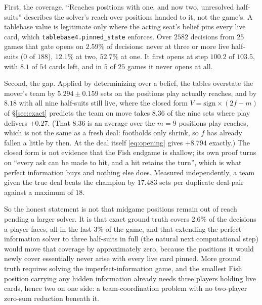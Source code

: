 \documentclass[11pt,letterpaper]{article}
\begin{document}
First, the coverage. ``Reaches positions with one, and now two, unresolved
half-suits'' describes the solver's reach over positions handed to it, not the
game's. A tablebase value is legitimate only where the acting seat's belief pins
every live card, which \texttt{tablebase4.pinned\_state} enforces. Over $2582$
decisions from $25$ games that gate opens on $2.59\%$ of decisions: never at
three or more live half-suits ($0$ of $188$), $12.1\%$ at two, $52.7\%$ at one.
It first opens at step $100.2$ of $103.5$, with $8.1$ of $54$ cards left, and in
$5$ of $25$ games it never opens at all.

Second, the gap. Applied by determinizing over a belief, the tables overstate
the mover's team by $5.294 \pm 0.159$ sets on the positions play actually
reaches, and by $8.18$ with all nine half-suits still live, where the closed form
$V = \mathrm{sign} \times (2f - m)$ of \S\ref{sec:exact} predicts the team on
move takes $8.36$ of the nine sets where play delivers $+0.27$. (That $8.36$ is
an average over the $m = 9$ positions play reaches, which is not the same as a
fresh deal: footholds only shrink, so $f$ has already fallen a little by then.
At the deal itself \eqref{eq:opening} gives $+8.794$ exactly.) The closed form
is not evidence that the Fish endgame is shallow; its own proof turns on ``every
ask can be made to hit, and a hit retains the turn'', which is what perfect
information buys and nothing else does. Measured independently, a team given
the true deal beats the champion by $17.483$ sets per duplicate deal-pair
against a maximum of $18$.

So the honest statement is not that midgame positions remain out of reach
pending a larger solver. It is that exact ground truth covers $2.6\%$ of the
decisions a player faces, all in the last $3\%$ of the game, and that extending
the perfect-information solver to three half-suits in full (the natural next
computational step) would move that coverage by approximately zero, because
the positions it would newly cover essentially never arise with every live card
pinned. More ground truth requires solving the imperfect-information game, and
the smallest Fish position carrying any hidden information already needs three
players holding live cards, hence two on one side: a team-coordination problem
with no two-player zero-sum reduction beneath it.
\end{document}
